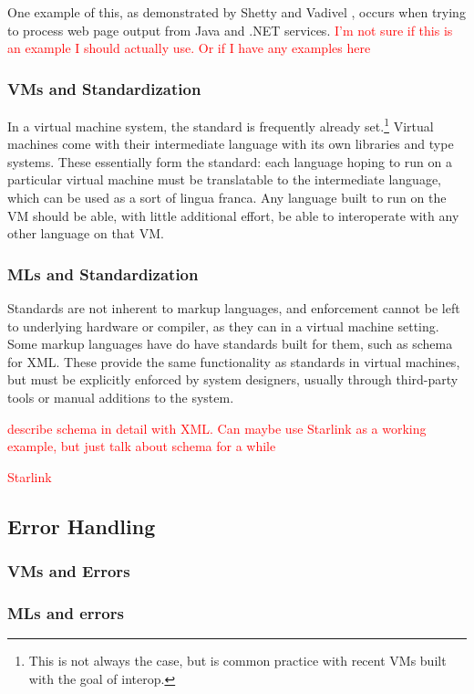 \documentclass{sig-alternate}
\newcommand{\mycomment}[1]{\textcolor{red}{#1}}
\begin{document}
{One example of this, as demonstrated by Shetty and Vadivel \cite{Shetty:2009}, occurs when trying to process web page output from Java and .NET services. \mycomment{I'm not sure if this is an example I should actually use. Or if I have any examples here}

\subsubsection*{VMs and Standardization}
In a virtual machine system, the standard is frequently already set.\footnote{This is not always the case, but is common practice with recent VMs built with the goal of interop.} Virtual machines come with their intermediate language with its own libraries and type systems. These essentially form the standard: each language hoping to run on a particular virtual machine must be translatable to the intermediate language, which can be used as a sort of lingua franca. Any language built to run on the VM should be able, with little additional effort, be able to interoperate with any other language on that VM.


\subsubsection*{MLs and Standardization}
Standards are not inherent to markup languages, and enforcement cannot be left to underlying hardware or compiler, as they can in a virtual machine setting. Some markup languages have do have standards built for them, such as schema for XML. These provide the same functionality as standards in virtual machines, but must be explicitly enforced by system designers, usually through third-party tools or manual additions to the system.

\mycomment{describe schema in detail with XML. Can maybe use Starlink as a working example, but just talk about schema for a while}
	
\mycomment{Starlink}



\subsection{Error Handling}\label{errors}

\subsubsection*{VMs and Errors}

\subsubsection*{MLs and errors}


}
\end{document}
